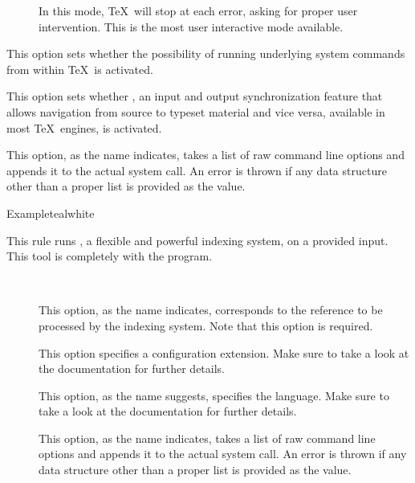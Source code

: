 \begin{description}
\begin{description}
\begin{description}
\item[] In this mode, \TeX\ will stop at each error, asking for proper user intervention. This is the most user interactive mode available.
\end{description}

\item[\rpsbox{shell}] This option sets whether the possibility of running underlying system commands from within \TeX\ is activated.

\item[\rpsbox{synctex}] This option sets whether , an input and output synchronization feature that allows navigation from source to typeset material and vice versa, available in most \TeX\ engines, is activated.

\item[\abox{options}] This option, as the name indicates, takes a list of raw command line options and appends it to the actual system call. An error is thrown if any data structure other than a proper list is provided as the value.
\end{description}

\begin{codebox}{Example}{teal}{\icnote}{white}
\end{codebox}

\item[\rulebox{xindex}]
This rule runs , a flexible and powerful indexing system, on a provided  input. This tool is completely with the  program.

\begin{description}
\item[~\rqbox] This option, as the name indicates, corresponds to the  reference to be processed by the indexing system. Note that this option is required.

\item[] This option specifies a configuration extension. Make sure to take a look at the documentation for further details.

\item[] This option, as the name suggests, specifies the language. Make sure to take a look at the documentation for further details.

\item[] This option, as the name indicates, takes a list of raw command line options and appends it to the actual system call. An error is thrown if any data structure other than a proper list is provided as the value.
\end{description}


\end{description}

